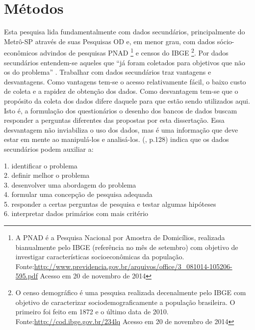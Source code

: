 \chapter{Métodos}\label{chap:metodo}


Esta pesquisa lida fundamentalmente com dados secundários, principalmente do Metrô-SP através de suas Pesquisas OD e, em menor grau, com dados sócio-econômicos advindos de pesquisas PNAD
\footnote{A PNAD é a Pesquisa Nacional por Amostra de Domicílios, realizada bianualmente pelo IBGE (referência no mês de setembro) com objetivo de investigar características socioeconômicas da população. Fonte:\url{http://www.previdencia.gov.br/arquivos/office/3_081014-105206-595.pdf} Acesso em 20 de novembro de 2014} e censos do IBGE
\footnote{O censo demográfico é uma pesquisa realizada decenalmente pelo IBGE com objetivo de caracterizar sociodemograficamente a população brasileira. O primeiro foi feito em 1872 e o último data de 2010. Fonte:\url{http://cod.ibge.gov.br/234lq} Acesso em 20 de novembro de 2014}.
Por dados secundários entendem-se aqueles que ``já foram coletados para objetivos que não os do problema'' \cite[p.127]{MALHORTA2001}. Trabalhar com dados secundários traz vantagens e desvantagens. Como vantagens tem-se o acesso relativamente fácil, o baixo custo de coleta e a rapidez de obtenção dos dados. Como desvantagem tem-se que o propósito da coleta dos dados difere daquele para que estão sendo utilizados aqui. Isto é, a formulação dos questionários o desenho dos bancos de dados buscam responder a perguntas diferentes das propostas por esta dissertação.
Essa desvantagem não inviabiliza o uso dos dados, mas é uma informação que deve estar em mente ao manipulá-los e analisá-los.  (\citeyear{MALHORTA2001}, p.128) indica que os dados secundários podem auxiliar a:

\begin{citacao}
	1. identificar o problema\\
	2. definir melhor o problema\\
	3. desenvolver uma abordagem do problema\\
	4. formular uma concepção de pesquisa adequada\\
	5. responder a certas perguntas de pesquisa e testar algumas hipóteses\\
	6. interpretar dados primários com mais critério
\end{citacao}

